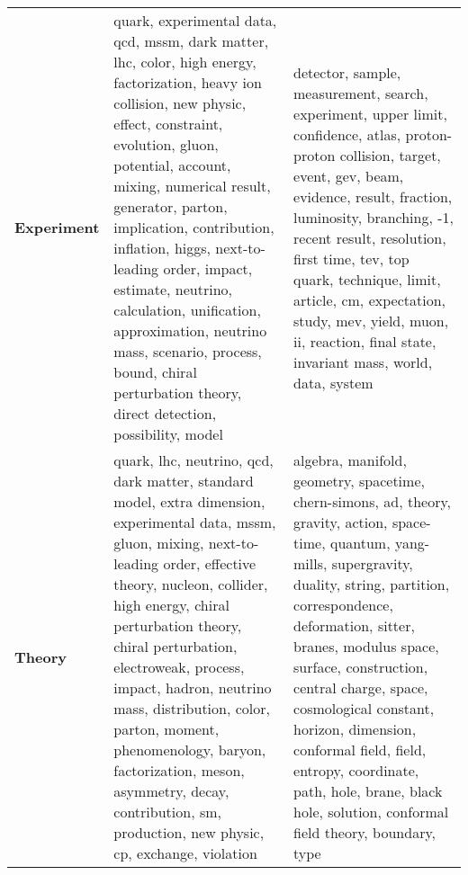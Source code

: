 \begin{longtable}{p{3cm}|p{5cm}|p{5cm}}
\bottomrule
\endlastfoot
\textbf{Experiment} &  quark, experimental data, qcd, mssm, dark matter, lhc, color, high energy, factorization, heavy ion collision, new physic, effect, constraint, evolution, gluon, potential, account, mixing, numerical result, generator, parton, implication, contribution, inflation, higgs, next-to-leading order, impact, estimate, neutrino, calculation, unification, approximation, neutrino mass, scenario, process, bound, chiral perturbation theory, direct detection, possibility, model &                                                          detector, sample, measurement, search, experiment, upper limit, confidence, atlas, proton-proton collision, target, event, gev, beam, evidence, result, fraction, luminosity, branching, -1, recent result, resolution, first time, tev, top quark, technique, limit, article, cm, expectation, study, mev, yield, muon, ii, reaction, final state, invariant mass, world, data, system \\
\textbf{Theory    } &                 quark, lhc, neutrino, qcd, dark matter, standard model, extra dimension, experimental data, mssm, gluon, mixing, next-to-leading order, effective theory, nucleon, collider, high energy, chiral perturbation theory, chiral perturbation, electroweak, process, impact, hadron, neutrino mass, distribution, color, parton, moment, phenomenology, baryon, factorization, meson, asymmetry, decay, contribution, sm, production, new physic, cp, exchange, violation &  algebra, manifold, geometry, spacetime, chern-simons, ad, theory, gravity, action, space-time, quantum, yang-mills, supergravity, duality, string, partition, correspondence, deformation, sitter, branes, modulus space, surface, construction, central charge, space, cosmological constant, horizon, dimension, conformal field, field, entropy, coordinate, path, hole, brane, black hole, solution, conformal field theory, boundary, type \\
\end{longtable}
